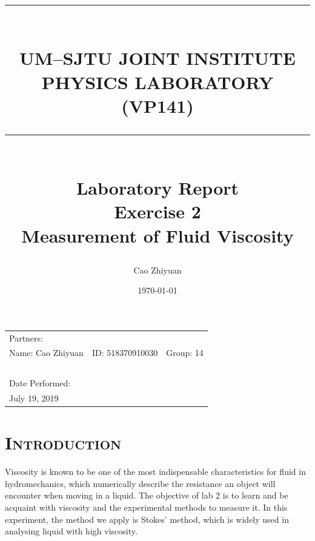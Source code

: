 \documentclass[a4paper,12pt]{article}
\title{ \rule{\textwidth}{0.3mm} \\UM–SJTU JOINT INSTITUTE \\ PHYSICS LABORATORY \\ (VP141) \\ \rule{\textwidth}{0.3mm} \\ [30 mm]  \Large{Laboratory Report} \\[5 mm]  Exercise 2 \\[1 mm] Measurement of Fluid Viscosity\\[15 mm]} %
\author{Cao Zhiyuan} %
\date{\today} %
\begin{document}
\scshape

\maketitle %

\begin{center}
\begin{tabular}{l l l}
\\[16 mm]
Partners:  \\
Name: Cao Zhiyuan & ID: 518370910030 & Group: 14 \\
~\\
Date Performed:\\
July 19, 2019\\
\end{tabular}
\end{center}
\thispagestyle{empty}


\newpage


\small\tableofcontents
\thispagestyle{empty}


\newpage


\setcounter{page}{1}
\upshape
\section{\textsc{Introduction}}
Viscosity is known to be one of the most indispensable characteristics for fluid in hydromechanics, which numerically describe the resistance an object will encounter when moving in a liquid. The objective of lab 2 is to learn and be acquaint with viscosity and the experimental methods to measure it. In this experiment, the method we apply is Stokes' method, which is widely used in analysing liquid with high viscosity.

\end{document}

